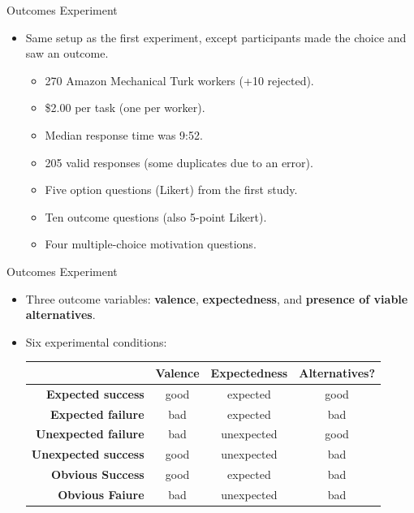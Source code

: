 \documentclass[xcolor=x11names]{beamer}
\begin{document}
\begin{frame}{Outcomes Experiment}
  \begin{itemize}\addtolength{\itemsep}{0.5\baselineskip}
    \item Same setup as the first experiment, except participants made the choice and saw an outcome.
    \begin{itemize}\addtolength{\itemsep}{0.5\baselineskip}
      \vspace{0.5\baselineskip}
      \item 270 Amazon Mechanical Turk workers (+10 rejected).
      \item \$2.00 per task (one per worker).
      \item Median response time was 9:52.
      \item 205 valid responses (some duplicates due to an error).
      \item Five option questions (Likert) from the first study.
      \item Ten outcome questions (also 5-point Likert).
      \item Four multiple-choice motivation questions.
    \end{itemize}
  \end{itemize}
\end{frame}

\begin{frame}{Outcomes Experiment}
  \begin{itemize}\addtolength{\itemsep}{0.5\baselineskip}
    \item Three outcome variables: \textbf{valence}, \textbf{expectedness}, and \textbf{presence of viable alternatives}.
    \item Six experimental conditions: \\
      \vspace{0.5\baselineskip}
      \footnotesize
      \begin{tabular}{r c c c}
        \toprule
        & \textbf{Valence} & \textbf{Expectedness} & \textbf{Alternatives?} \\
        \midrule
        \textbf{Expected success} & good & expected & good \\
        \textbf{Expected failure} & bad & expected & bad \\
        \textbf{Unexpected failure} & bad & unexpected & good \\
        \textbf{Unexpected success} & good & unexpected & bad \\
        \textbf{Obvious Success}  & good & expected & bad \\
        \textbf{Obvious Faiure} & bad & unexpected & bad \\
        \bottomrule
      \end{tabular}
  \end{itemize}
\end{frame}
\end{document}
